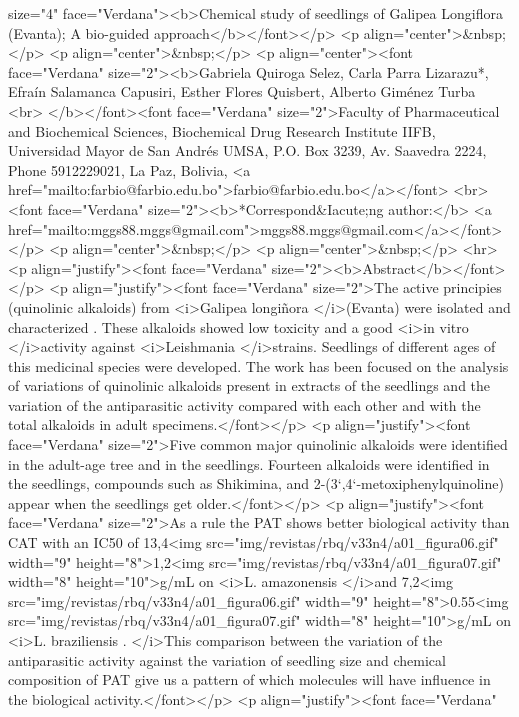 size="4" face="Verdana"><b>Chemical study of seedlings of Galipea Longiflora
(Evanta); A bio-guided approach</b></font></p> <p align="center">\&nbsp;</p> <p
align="center">\&nbsp;</p> <p align="center"><font face="Verdana"
size="2"><b>Gabriela Quiroga Selez, Carla Parra Lizarazu*, Efraín Salamanca
Capusiri, Esther Flores Quisbert, Alberto Giménez Turba <br> </b></font><font
face="Verdana" size="2">Faculty of Pharmaceutical and Biochemical Sciences,
Biochemical Drug Research Institute IIFB, Universidad Mayor de San Andrés UMSA,
P.O. Box 3239, Av. Saavedra 2224, Phone 5912229021, La Paz, Bolivia, <a
href="mailto:farbio@farbio.edu.bo">farbio@farbio.edu.bo</a></font> <br> <font
face="Verdana" size="2"><b>*Correspond\&Iacute;ng author:</b> <a
href="mailto:mggs88.mggs@gmail.com">mggs88.mggs@gmail.com</a></font></p> <p
align="center">\&nbsp;</p> <p align="center">\&nbsp;</p> <hr> <p
align="justify"><font face="Verdana" size="2"><b>Abstract</b></font></p> <p
align="justify"><font face="Verdana" size="2">The active principies (quinolinic
alkaloids) from <i>Galipea longiñora </i>(Evanta) were isolated and
characterized . These alkaloids showed low toxicity and a good <i>in vitro
</i>activity against <i>Leishmania </i>strains. Seedlings of different ages of
this medicinal species were developed. The work has been focused on the analysis
of variations of quinolinic alkaloids present in extracts of the seedlings and
the variation of the antiparasitic activity compared with each other and with
the total alkaloids in adult specimens.</font></p> <p align="justify"><font
face="Verdana" size="2">Five common major quinolinic alkaloids were identified
in the adult-age tree and in the seedlings. Fourteen alkaloids were identified
in the seedlings, compounds such as Shikimina, and
2-(3`,4`-metoxiphenylquinoline) appear when the seedlings get older.</font></p>
<p align="justify"><font face="Verdana" size="2">As a rule the PAT shows better
biological activity than CAT with an IC50 of 13,4<img
src="img/revistas/rbq/v33n4/a01\_{}figura06.gif" width="9" height="8">1,2<img
src="img/revistas/rbq/v33n4/a01\_{}figura07.gif" width="8" height="10">g/mL on
<i>L. amazonensis </i>and 7,2<img
src="img/revistas/rbq/v33n4/a01\_{}figura06.gif" width="9" height="8">0.55<img
src="img/revistas/rbq/v33n4/a01\_{}figura07.gif" width="8" height="10">g/mL on
<i>L. braziliensis . </i>This comparison between the variation of the
antiparasitic activity against the variation of seedling size and chemical
composition of PAT give us a pattern of which molecules will have influence in
the biological activity.</font></p> <p align="justify"><font face="Verdana"
